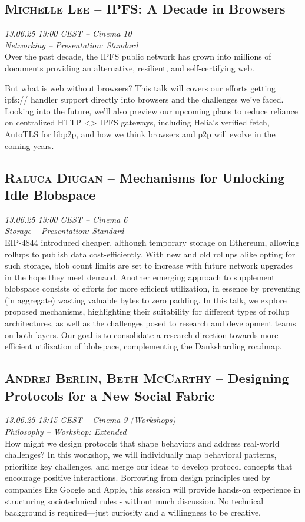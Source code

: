 \clearpage
\subsection {\textsc{Michelle Lee}  -- IPFS: A Decade in Browsers} \noindent \textit {13.06.25 13:00 CEST -- Cinema 10\\ Networking -- Presentation: Standard}\\[1em] Over the past decade, the IPFS public network has grown into millions of documents providing an alternative, resilient, and self-certifying web.

But what is web without browsers? This talk will covers our efforts getting ipfs:// handler support directly into browsers and the challenges we've faced. Looking into the future, we'll also preview our upcoming plans to reduce reliance on centralized HTTP \textless{}\textgreater{} IPFS gateways, including Helia's verified fetch, AutoTLS for libp2p, and how we think browsers and p2p will evolve in the coming years.

\clearpage
\subsection {\textsc{Raluca Diugan}  -- Mechanisms for Unlocking Idle Blobspace} \noindent \textit {13.06.25 13:00 CEST -- Cinema 6\\ Storage -- Presentation: Standard}\\[1em] EIP-4844 introduced cheaper, although temporary storage on Ethereum, allowing rollups to publish data cost-efficiently. With new and old rollups alike opting for such storage, blob count limits are set to increase with future network upgrades in the hope they meet demand. Another emerging approach to supplement blobspace consists of efforts for more efficient utilization, in essence by preventing (in aggregate) wasting valuable bytes to zero padding. In this talk, we explore proposed mechanisms, highlighting their suitability for different types of rollup architectures, as well as the challenges posed to research and development teams on both layers. Our goal is to consolidate a research direction towards more efficient utilization of blobspace, complementing the Danksharding roadmap.

\clearpage
\subsection {\textsc{Andrej Berlin, Beth McCarthy}  -- Designing Protocols for a New Social Fabric} \noindent \textit {13.06.25 13:15 CEST -- Cinema 9 (Workshops)\\ Philosophy -- Workshop: Extended}\\[1em] How might we design protocols that shape behaviors and address real-world challenges? In this workshop, we will individually map behavioral patterns, prioritize key challenges, and merge our ideas to develop protocol concepts that encourage positive interactions. Borrowing from design principles used by companies like Google and Apple, this session will provide hands-on experience in structuring sociotechnical rules - without much discussion. No technical background is required—just curiosity and a willingness to be creative.

